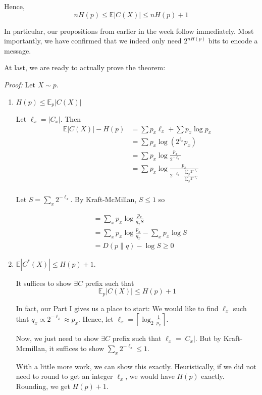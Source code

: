 \documentclass[12pt]{report}
\newcommand{\E}{\mathbb{E}}
\newcommand{\abs}[1]{\left\vert #1 \right\vert}
\DeclareMathOperator*{\argmin}{\arg\min}
\newenvironment*{tbox}[2][gray]{
    \begin{tcolorbox}[
        parbox=false,
        colback=#1!5!white,
        colframe=#1!75!black,
        breakable,
        title={#2}
    ]}
    {\end{tcolorbox}}
\begin{document}
Hence,
\[nH(p)\leq \E{\abs{C(X)}} \leq nH(p) + 1\]

In particular, our propositions from earlier in the week follow immediately. Most importantly, we have confirmed that we indeed only need $2^{nH(p)}$ bits to encode a message.

At last, we are ready to actually prove the theorem:

\begin{tbox}{\textbf{Theorem:} Let $\vec X \sim \vec p$. For the optimal code $C^* = \argmin_{C \text{ prefix}} \E_{\vec p} [\abs{C(X)}]$,
		\[H(\vec p) \leq \abs{\E_{\vec p}} C^*(X) \leq H(\vec p ) + 1\]}
	\emph{Proof:} Let $X \sim p$.

	\begin{enumerate}
		\item $H(p) \leq \E_p \abs{C(X)}$

		      Let $\ell_x = \abs{C_x}$. Then
		      \begin{align*}
			      \E\abs{C(X)} - H(p) & = \sum p_x \ell_x + \sum p_x \log p_x                                                       \\
			                          & =  \sum p_x \log(2^{\ell_x} p_x)                                                            \\
			                          & = \sum p_x \log \frac{p_x}{2^{-\ell_x}}                                                     \\
			                          & = \sum p_x \log \frac{p_x}{2^{-\ell_x} \cdot \frac{\sum_y 2^{-\ell_y}}{\sum_y 2^{-\ell_y}}} \\
		      \end{align*}

		      Let $S = \sum_x 2^{-\ell_x}$. By Kraft-McMillan, $S \leq 1$ so

		      \begin{align}
			       & = \sum_x p_x \log \frac{p_x}{q_x S}                   \\
			       & = \sum_x p_x \log \frac{p_x}{q_x} - \sum_x p_x \log S \\
			       & = D(p \parallel q) - \log S \geq 0
		      \end{align}

		\item $\E\abs{C^*(X)} \leq H(p) + 1$.

		      It suffices to show $\exists C$ prefix such that
		      \[\E_p\abs{C(X)} \leq H(p) + 1\]

		      In fact, our Part I gives us a place to start: We would like to find $\ell_x$ such that $q_x \propto 2^{-\ell_x} \approx p_x$. Hence, let $\ell_x = \left\lceil \log_2 \frac{1}{p_x} \right\rceil$.

		      Now, we just need to show $\exists C$ prefix such that $\ell_x = \abs{C_x}$. But by Kraft-Mcmillan, it suffices to show $\sum_x 2^{-\ell_x} \leq 1$.

		      With a little more work, we can show this exactly. Heuristically, if we did not need to round to get an integer $\ell_x$, we would have $H(p)$ exactly. Rounding, we get $H(p) + 1$.
	\end{enumerate}
\end{tbox}
\end{document}
